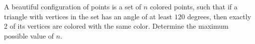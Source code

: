 A beautiful configuration of points is a set of $n$ colored points, such that if a triangle with vertices in the set has an angle of at least $120$ degrees, then exactly 2 of its vertices are colored with the same color. Determine the maximum possible value of $n$.